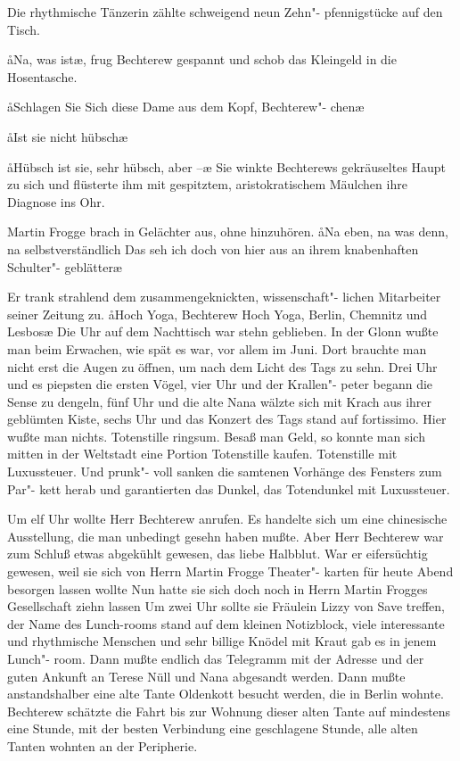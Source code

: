 Die rhythmische Tänzerin zählte schweigend neun Zehn"-%
pfennigstücke auf den Tisch.

\aa{}Na, was ist\frag{}\ae{},\eingriff{eS52-1}{ist\frag{}\ae{}, ] ist\frag{}\ae{}} frug Bechterew gespannt und schob das
Kleingeld in die Hosentasche.

\aa{}Schlagen Sie Sich\eingriff{eS52-2}{Sich ] sich} diese Dame aus dem Kopf, Bechterew"-%
chen\ausr{}\ae{}

\aa{}Ist sie nicht hübsch\frag{}\ae{}

\aa{}Hübsch ist sie, sehr hübsch, aber --\ae{} Sie winkte Bechterews
gekräuseltes Haupt zu sich und flüsterte ihm mit gespitztem,
aristokratischem Mäulchen ihre Diagnose ins Ohr.

Martin Frogge brach in Gelächter aus, ohne hinzuhören.
\aa{}Na eben, na was denn, na selbstverständlich\ausr{} Das seh
ich doch von hier aus an ihrem knabenhaften Schulter"-%
geblätter\ausr{}\ae{}

Er trank strahlend dem zusammengeknickten, wissenschaft"-%
lichen Mitarbeiter seiner Zeitung zu. \aa{}Hoch Yoga, Bechterew\ausr{}
Hoch Yoga, Berlin, Chemnitz und Lesbos\ausr{}\ae{}
\abstand{}
Die Uhr auf dem Nachttisch war stehn geblieben. In der
Glonn wußte man beim Erwachen, wie spät es war, vor
allem im Juni. Dort brauchte man nicht erst die Augen zu
öffnen, um nach dem Licht des Tags zu sehn. Drei Uhr
und es piepsten die ersten Vögel, vier Uhr und der Krallen"-%
peter begann die Sense zu dengeln, fünf Uhr und die alte
Nana wälzte sich mit Krach aus ihrer geblümten Kiste, sechs
Uhr und das Konzert des Tags stand auf fortissimo. Hier
wußte man nichts. Totenstille ringsum. Besaß man Geld,
so konnte man sich mitten in der Weltstadt eine Portion
Totenstille kaufen. Totenstille mit Luxussteuer. Und prunk"-%
voll sanken die samtenen Vorhänge des Fensters zum Par"-%
kett herab und garantierten das Dunkel, das Totendunkel
mit Luxussteuer.

Um elf Uhr wollte Herr Bechterew anrufen. Es handelte
sich um eine chinesische Ausstellung, die man unbedingt gesehn
haben mußte. Aber Herr Bechterew war zum Schluß etwas
abgekühlt gewesen, das liebe Halbblut. War er eifersüchtig
gewesen, weil sie sich von Herrn Martin Frogge Theater"-%
karten für heute Abend besorgen lassen wollte\frag{} Nun hatte
sie sich doch noch in Herrn Martin Frogges Gesellschaft ziehn
lassen\ausr{} Um zwei Uhr sollte sie Fräulein Lizzy von Save
treffen, der Name des Lunch-rooms stand auf dem kleinen
Notizblock, viele interessante und rhythmische Menschen und
sehr billige Knödel mit Kraut gab es in jenem Lunch"-%
room. Dann mußte endlich das Telegramm mit der Adresse
und der guten Ankunft an Terese Nüll und Nana abgesandt
werden. Dann mußte anstandshalber eine alte Tante
Oldenkott besucht werden, die in Berlin wohnte. Bechterew
schätzte die Fahrt bis zur Wohnung dieser alten Tante auf
mindestens eine Stunde, mit der besten Verbindung eine
geschlagene Stunde, alle alten Tanten wohnten an der
Peripherie.

